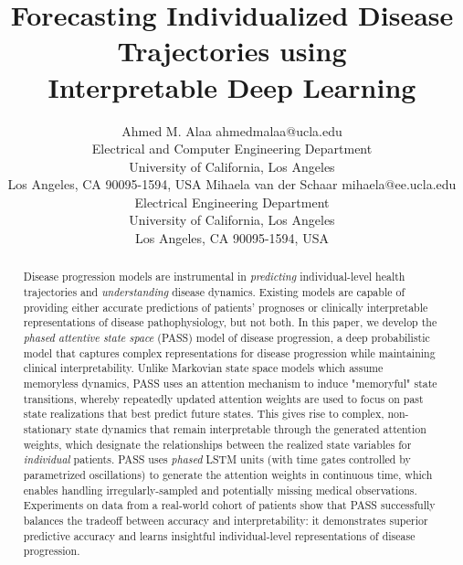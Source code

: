 \documentclass[twoside,11pt]{article}
\begin{document}
\title{Forecasting Individualized Disease Trajectories using\\ Interpretable Deep Learning}

\author{\name Ahmed M. Alaa \email ahmedmalaa@ucla.edu \\
       \addr Electrical and Computer Engineering Department\\
       University of California, Los Angeles\\
       Los Angeles, CA 90095-1594, USA
       \AND
       \name Mihaela van der Schaar \email mihaela@ee.ucla.edu \\
       \addr Electrical Engineering Department\\
       University of California, Los Angeles\\
       Los Angeles, CA 90095-1594, USA}


\maketitle

\begin{abstract}Disease progression models are instrumental in {\it predicting} individual-level health trajectories and {\it understanding} disease dynamics. Existing models are capable of providing either accurate predictions of patients' prognoses or clinically interpretable representations of disease pathophysiology, but not both. In this paper, we develop the {\it phased attentive state space} (PASS) model of disease progression, a deep probabilistic model that captures complex representations for disease progression while maintaining clinical interpretability. Unlike Markovian state space models which assume memoryless dynamics, PASS uses an attention mechanism to induce "memoryful" state transitions, whereby repeatedly updated attention weights are used to focus on past state realizations that best predict future states. This gives rise to complex, non-stationary state dynamics that remain interpretable through the generated attention weights, which designate the relationships between the realized state variables for {\it individual} patients. PASS uses {\it phased} LSTM units (with time gates controlled by parametrized oscillations) to generate the attention weights in continuous time, which enables handling irregularly-sampled and potentially missing medical observations. Experiments on data from a real-world cohort of patients show that PASS successfully balances the tradeoff between accuracy and interpretability: it demonstrates superior predictive accuracy and learns insightful individual-level representations of disease progression.
\end{abstract}
\end{document}
